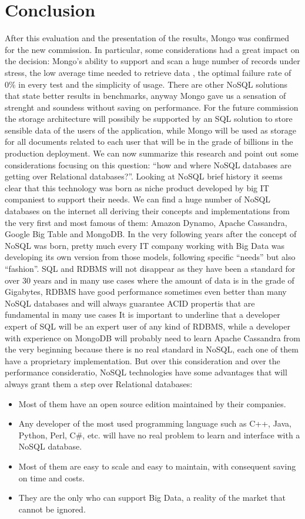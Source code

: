 \chapter{Conclusion}
\label{cha:conclusion}
After this evaluation and the presentation of the results, Mongo was confirmed for the new commission. In particular, some considerations had a great impact on the decision: Mongo's ability to support and scan a huge number of records under stress, the low average time needed to retrieve data , the optimal failure rate of 0\% in every test and the simplicity of usage.
There are other NoSQL solutions that state better results in benchmarks, anyway Mongo gave us a sensation of strenght and soundess without saving on performance.
For the future commission the storage architecture will possibily be supported by an SQL solution to store sensible data of the users of the application, while Mongo will be used as storage for all documents related to each user that will be in the grade of billions in the production deployment.
We can now summarize this research and point out some considerations focusing on this question: “how and where NoSQL databases are getting over Relational databases?”.
Looking at NoSQL brief history it seems clear that this technology was born as niche product developed by big IT companiest to support their needs. We can find a huge number of NoSQL databases on the internet all deriving their concepts and implementations from the very first and most famous of them: Amazon Dynamo, Apache Cassandra, Google Big Table and MongoDB.
In the very following years after the concept of NoSQL was born, pretty much every IT company working with Big Data was developing its own version from those models, following specific “needs” but also “fashion”.
SQL and RDBMS will not disappear as they have been a standard for over 30 years and in many use cases where the amount of data is in the grade of Gigabytes, RDBMS  have good performance sometimes even better than many NoSQL databases and will always guarantee ACID propertis that are fundamental in many use cases
It is important to underline that a developer expert of SQL will be an expert user of any kind of RDBMS, while a developer with experience on MongoDB will probably need to learn Apache Cassandra from the very beginning because there is no real standard in NoSQL, each one of them have a proprietary implementation.
But over this consideration and over the performance consideratio, NoSQL technologies have some advantages that will always grant them a step over Relational databases:
\begin{itemize}
	\item Most of them have an open source edition maintained by their companies.
	\item Any developer of the most used programming language such as C++, Java, Python, Perl, C\#, etc. will have no real problem to learn and interface with a NoSQL database.
	\item Most of them are easy to scale and easy to maintain, with consequent saving on time and costs.
	\item They are the only who can support Big Data, a reality of the market that cannot be ignored.
\end{itemize}
